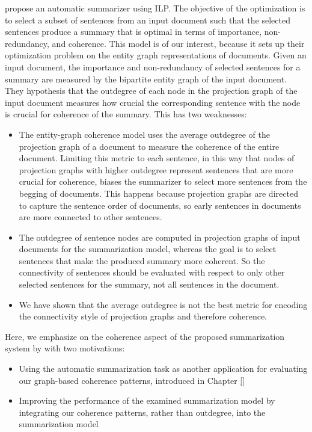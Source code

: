  propose an automatic summarizer using ILP.  
The objective of the optimization is to select a subset of sentences from an input document such that the selected sentences produce a summary that is optimal in terms of importance, non-redundancy, and coherence. 
This model is of our interest, because it sets up their optimization problem on the entity graph representations of documents. 
Given an input document, the importance and non-redundancy of selected sentences for a summary are measured by the bipartite entity graph of the input document. 
They hypothesis that the outdegree of each node in the projection graph of the input document measures how crucial the corresponding sentence with the node is crucial for coherence of the summary.  
This has two weaknesses: 

\begin{itemize}
	\item 
	The entity-graph coherence model uses the average outdegree of the projection graph of a document to measure the coherence of the entire document. 
	Limiting this metric to each sentence, in this way that nodes of projection graphs with higher outdegree represent sentences that are more crucial for coherence, biases the summarizer to select more sentences from the begging of documents. 
	This happens because projection graphs are directed to capture the sentence order of documents, so early sentences in documents are more connected to other sentences. 


	\item The outdegree of sentence nodes are computed in projection graphs of input documents for the summarization model,  
	whereas the goal is to select sentences that make the produced summary more coherent. So the connectivity of sentences should be evaluated with respect to only other selected sentences for the summary, not all sentences in the document. 


	\item 
	We have shown that the average outdegree is not the best metric for encoding the connectivity style of projection graphs and therefore coherence. 

\end{itemize} 

Here, we emphasize on the coherence aspect of the proposed summarization system by  with two motivations:
\begin{itemize}
	\item Using the automatic summarization task as another application for evaluating our graph-based coherence patterns, introduced in Chapter \ref{}

	\item Improving the performance of the examined summarization  model by integrating our coherence patterns, rather than outdegree, into the summarization model
\end{itemize}


